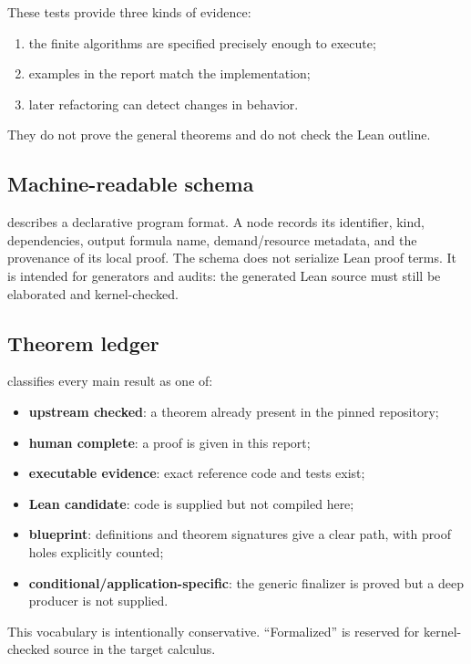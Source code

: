 These tests provide three kinds of evidence:

\begin{enumerate}
\item the finite algorithms are specified precisely enough to execute;
\item examples in the report match the implementation;
\item later refactoring can detect changes in behavior.
\end{enumerate}

They do not prove the general theorems and do not check the Lean outline.

\subsection{Machine-readable schema}

 describes a declarative program
format.  A node records its identifier, kind, dependencies, output formula
name, demand/resource metadata, and the provenance of its local proof.  The
schema does not serialize Lean proof terms.  It is intended for generators and
audits: the generated Lean source must still be elaborated and kernel-checked.

\subsection{Theorem ledger}

 classifies every main result as one of:

\begin{itemize}
\item \textbf{upstream checked}: a theorem already present in the pinned
repository;
\item \textbf{human complete}: a proof is given in this report;
\item \textbf{executable evidence}: exact reference code and tests exist;
\item \textbf{Lean candidate}: code is supplied but not compiled here;
\item \textbf{blueprint}: definitions and theorem signatures give a clear path,
with proof holes explicitly counted;
\item \textbf{conditional/application-specific}: the generic finalizer is
proved but a deep producer is not supplied.
\end{itemize}

This vocabulary is intentionally conservative.  ``Formalized'' is reserved for
kernel-checked source in the target calculus.

